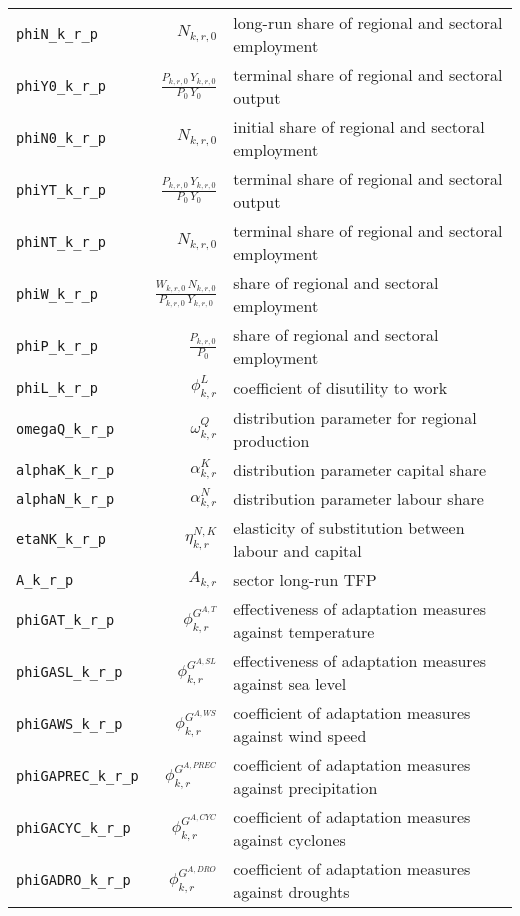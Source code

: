 \begin{center}
\begin{longtable}{lrl}
\texttt{phiN\_k\_r\_p} & ${N_{k,r,0}}$ & long-run share of regional and sectoral employment\\
\texttt{phiY0\_k\_r\_p} & $\frac{P_{k,r,0} \, Y_{k,r,0}}{P_{0} \, Y_{0}}$ & terminal share of regional and sectoral output\\
\texttt{phiN0\_k\_r\_p} & ${N_{k,r,0}}$ & initial share of regional and sectoral employment\\
\texttt{phiYT\_k\_r\_p} & $\frac{P_{k,r,0} \, Y_{k,r,0}}{P_{0} \, Y_{0}}$ & terminal share of regional and sectoral output\\
\texttt{phiNT\_k\_r\_p} & ${N_{k,r,0}}$ & terminal share of regional and sectoral employment\\
\texttt{phiW\_k\_r\_p} & $\frac{W_{k,r,0} \, N_{k,r,0}}{P_{k,r,0} \, Y_{k,r,0}}$ & share of regional and sectoral employment\\
\texttt{phiP\_k\_r\_p} & $\frac{P_{k,r,0}}{P_{0}}$ & share of regional and sectoral employment\\
\texttt{phiL\_k\_r\_p} & ${\phi^{L}_{k,r}}$ & coefficient of disutility to work\\
\texttt{omegaQ\_k\_r\_p} & ${\omega^{Q}_{k,r}}$ & distribution parameter for regional production\\
\texttt{alphaK\_k\_r\_p} & ${\alpha^{K}_{k,r}}$ & distribution parameter capital share\\
\texttt{alphaN\_k\_r\_p} & ${\alpha^{N}_{k,r}}$ & distribution parameter labour share\\
\texttt{etaNK\_k\_r\_p} & ${\eta^{N,K}_{k,r}}$ & elasticity of substitution between labour and capital\\
\texttt{A\_k\_r\_p} & ${A_{k,r}}$ & sector long-run TFP\\
\texttt{phiGAT\_k\_r\_p} & ${\phi^{G^{A,T}}_{k,r}}$ & effectiveness of adaptation measures against temperature\\
\texttt{phiGASL\_k\_r\_p} & ${\phi^{G^{A,SL}}_{k,r}}$ & effectiveness of adaptation measures against sea level\\
\texttt{phiGAWS\_k\_r\_p} & ${\phi^{G^{A,WS}}_{k,r}}$ & coefficient of adaptation measures against wind speed\\
\texttt{phiGAPREC\_k\_r\_p} & ${\phi^{G^{A,PREC}}_{k,r}}$ & coefficient of adaptation measures against precipitation\\
\texttt{phiGACYC\_k\_r\_p} & ${\phi^{G^{A,CYC}}_{k,r}}$ & coefficient of adaptation measures against cyclones\\
\texttt{phiGADRO\_k\_r\_p} & ${\phi^{G^{A,DRO}}_{k,r}}$ & coefficient of adaptation measures against droughts\\

\end{longtable}
\end{center}
